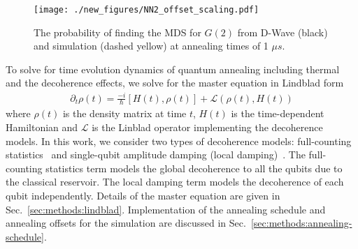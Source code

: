 \documentclass[prd,twocolumn,tightenlines,preprintnumbers,showpacs,superscriptaddress,notitlepage,nofootinbib,eqsecnum,floatfix,longbibliography,aps,10pt]{revtex4-2}
\begin{document}
\begin{figure}[b]
	\centering
	\texttt{[image: ./new\_figures/NN2\_offset\_scaling.pdf]}
	\caption{The probability of finding the MDS for $G(2)$ from D-Wave (black) and simulation (dashed yellow) at annealing times of 1 $\mu s$.}
	\label{fig:dwave1us}
\end{figure}


To solve for time evolution dynamics of quantum annealing including thermal and the decoherence effects, we solve for the master equation in Lindblad form
\begin{align}
 \partial_t \rho (t) =  \frac{-i}{\hbar} [H(t) , \rho(t)] + \mathcal{L}(\rho(t), H(t))
\end{align}
where $\rho (t)$ is the density matrix at time $t$, $H(t)$ is the time-dependent Hamiltonian and $\mathcal{L}$ is the Linblad operator implementing the decoherence models.
In this work, we consider two types of decoherence models: full-counting statistics~\cite{PhysRevE.90.022103,RevModPhys.81.1665} and single-qubit amplitude damping (local damping)~\cite{10.5555/1972505,preskill1998lecture}.
The full-counting statistics term models the global decoherence to all the qubits due to the classical reservoir.
The local damping term models the decoherence of each qubit independently.
Details of the master equation are given in Sec.~\ref{sec:methods:lindblad}.
Implementation of the annealing schedule and annealing offsets for the simulation are discussed in Sec.~\ref{sec:methods:annealing-schedule}.
\end{document}
